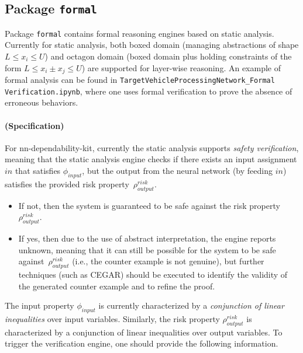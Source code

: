 \documentclass{article}
\begin{document}
\subsection{Package \texttt{formal}}

Package \texttt{formal} contains formal reasoning engines based on static analysis. Currently for static analysis, both boxed domain (managing abstractions of shape $L \leq  x_i \leq U$) and octagon domain (boxed domain plus holding constraints of the form $L \leq  x_i \pm  x_j \leq U$) are supported for layer-wise reasoning. An example of formal analysis can be found in \texttt{TargetVehicleProcessingNetwork\_Formal\\Verification.ipynb}, where one uses formal verification to prove the absence of erroneous behaviors. 

\paragraph{(Specification)} For \textsf{nn-dependability-kit}, currently the static analysis supports \emph{safety verification}, meaning that the static analysis engine checks if there exists an input assignment $in$ that satisfies  $\phi_{input}$, but the output from the neural network (by feeding $in$) satisfies the provided risk property~$\rho^{risk}_{output}$. 

\begin{itemize}
    \item If not, then the system is guaranteed to be safe against the risk property~$\rho^{risk}_{output}$.  
    \item If yes, then due to the use of abstract interpretation, the engine reports \textsf{unknown}, meaning that it can still be possible for the system to be safe against~$\rho^{risk}_{output}$ (i.e., the counter example is not genuine), but further techniques (such as CEGAR) should be executed to identify the validity of the generated counter example and to refine the proof.
\end{itemize}

The input property $\phi_{input}$ is currently characterized by a \emph{conjunction of linear inequalities} over input variables.  Similarly, the risk property $\rho^{risk}_{output}$ is characterized by a conjunction of linear inequalities over output variables. 
To trigger the verification engine, one should provide the following information.
\end{document}
